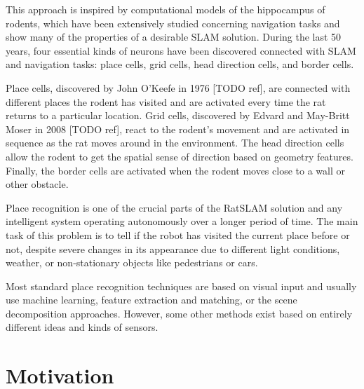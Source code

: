 This approach is inspired by computational models of the hippocampus of rodents, which have been extensively studied concerning navigation tasks and show many of the properties of a desirable SLAM solution. During the last 50 years, four essential kinds of neurons have been discovered connected with SLAM and navigation tasks: place cells, grid cells, head direction cells, and border cells.\par
Place cells, discovered by John O'Keefe in 1976 [TODO ref], are connected with different places the rodent has visited and are activated every time the rat returns to a particular location. Grid cells, discovered by Edvard and May-Britt Moser in 2008 [TODO ref], react to the rodent's movement and are activated in sequence as the rat moves around in the environment. The head direction cells allow the rodent to get the spatial sense of direction based on geometry features. Finally, the border cells are activated when the rodent moves close to a wall or other obstacle.\par
Place recognition is one of the crucial parts of the RatSLAM solution and any intelligent system operating autonomously over a longer period of time. The main task of this problem is to tell if the robot has visited the current place before or not, despite severe changes in its appearance due to different light conditions, weather, or non-stationary objects like pedestrians or cars.\par
Most standard place recognition techniques are based on visual input and usually use machine learning, feature extraction and matching, or the scene decomposition approaches. However, some other methods exist based on entirely different ideas and kinds of sensors.


\section{Motivation}


